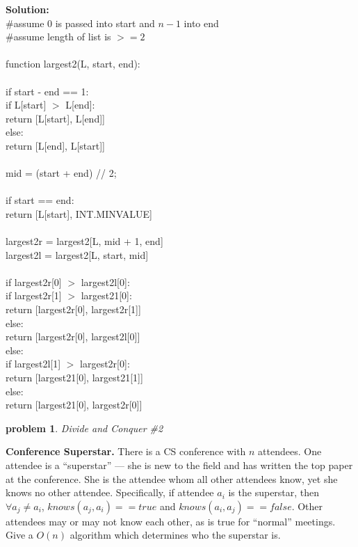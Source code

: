 \documentclass[10pt]{article}
\newtheorem{problem}{\sc\color{cit}problem}
\begin{document}
\textbf{Solution:} \\
\#assume $0$ is passed into start and $n - 1$ into end \\
\#assume length of list is $>= 2$ \\ \\
function largest2(L, start, end): \\ \\
if start - end == 1: \\
\null \quad if L[start] $>$ L[end]: \\
\null \quad \null \quad return [L[start], L[end]] \\
\null \quad else: \\
\null \quad \null \quad return [L[end], L[start]] \\ \\
mid = (start + end) // 2; \\ \\
if start == end: \\
\null \quad return [L[start], INT.MINVALUE] \\ \\
largest2r = largest2[L, mid + 1, end] \\
largest2l = largest2[L, start, mid] \\ \\
if largest2r[0] $>$ largest2l[0]: \\
\null \quad if largest2r[1] $>$ largest21[0]: \\
\null \quad \null \quad return [largest2r[0], largest2r[1]] \\
\null \quad else:\\
\null \quad \null \quad return [largest2r[0], largest2l[0]] \\
else: \\
\null \quad if largest2l[1] $>$ largest2r[0]: \\
\null \quad \null \quad return [largest21[0], largest21[1]] \\ 
\null \quad else:\\
\null \quad \null \quad return [largest21[0], largest2r[0]] 
        
\pagebreak
	
 \begin{problem} Divide and Conquer \#2\end{problem}

\noindent
\textbf{Conference Superstar.}  There is a CS conference with $n$ attendees. One attendee is a ``superstar'' --- she is new to the field and has written the top paper at the conference.  She is the attendee whom all other attendees know, yet she knows no other attendee.  Specifically, if attendee $a_i$ is the superstar, then $\forall a_j \neq a_i$, $knows(a_j, a_i) == true$ and $knows(a_i, a_j) == false$.  Other attendees may or may not know each other, as is true for ``normal'' meetings.  Give a $O(n)$ algorithm which determines who the superstar is.
\end{document}

